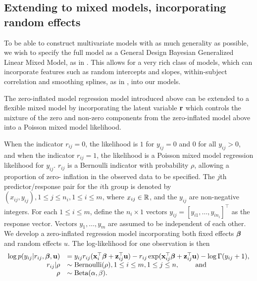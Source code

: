 \subsection{Extending to mixed models, incorporating random effects}

To be able to construct multivariate models with as much generality as
possible, we wish to specify the full model as a General Design Bayesian
Generalized Linear Mixed Model, as in \cite{Zhao2006}. This allows for a very
rich class of models, which can incorporate features such as random intercepts
and slopes, within-subject correlation and smoothing splines, as in
\cite{Wand2008}, into our models.

The zero-inflated model regression model introduced above can be extended to a
flexible mixed model by incorporating the latent variable ${\bf r}$ which controls
the mixture of the zero and non-zero components from the zero-inflated model
above into a Poisson mixed model likelihood.

When the indicator $r_{ij} = 0$, the likelihood is $1$ for $y_{ij} = 0$ and $0$
for all $y_{ij} > 0$, and when the indicator $r_{ij} = 1$, the likelihood is a
Poisson mixed model regression likelihood for $y_{ij}$. $r_{ij}$ is a
Bernoulli indicator with probability $\rho$, allowing a proportion of zero-
inflation in the observed data to be specified. The $j$th predictor/response
pair for the $i$th group is denoted by $(x_{ij}, y_{ij}), 1 \leq j \leq n_i, 1
\leq i \leq m$, where $x_{ij} \in {\mathbb{R}}$, and the $y_{ij}$ are non-negative
integers. For each $1 \leq i \leq m$, define the $n_i \times 1$ vectors $y_{ij}
= [y_{i 1}, \ldots, y_{i n_i}]^\top$ as the response vector. Vectors $y_1,
\ldots, y_m$ are assumed to be independent of each other. We develop a
zero-inflated regression model incorporating both fixed effects ${\boldsymbol \beta}$ and
random effects $u$. The log-likelihood for one observation is then
\begin{equation*}
	\begin{array}{rl}
		\log p(y_{ij} | r_{ij}, {\boldsymbol \beta}, {\bf u}) & = y_{ij} r_{ij} ({\bf x}_i^\top {\boldsymbol\beta} + {\bf z}_{ij}^\top {\bf u}) - r_{ij} \exp ({\bf x}_{ij}^\top {\boldsymbol\beta} + {\bf z}_{ij}^\top {\bf u}) - \log \Gamma (y_{ij} + 1), \\
		r_{ij} | \rho                  & \sim \text{Bernoulli}(\rho), 1 \leq i \leq m, 1 \leq j \leq n, \qquad \text{ and }                                                              \\
		\rho                        & \sim \text{Beta}(\alpha, \beta).                                                                                              \\
	\end{array}
\end{equation*}

